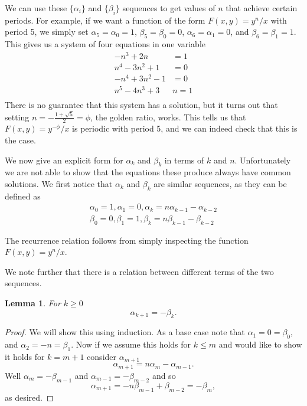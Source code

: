 \documentclass[12pt]{article}
\newtheorem{lemma}{Lemma}
\begin{document}
We can use these $\{\alpha_i\}$ and $\{\beta_i\}$ sequences to get values of $n$ that achieve certain periods. For example, if we want a function of the form $F(x,y) = y^n/x$ with period 5, we simply set $\alpha_5 = \alpha_0 = 1$, $\beta_5 = \beta_0 = 0$, $\alpha_6 = \alpha_1 = 0$, and $\beta_6 = \beta_1 = 1$. This gives us a system of four equations in one variable
\begin{align*}
-n^3+2n &= 1\\
n^4-3n^2+1&=0\\
-n^4+3n^2 -1&= 0\\
n^5-4n^3+3&n=1\\
\end{align*}
There is no guarantee that this system has a solution, but it turns out that setting $n = -\frac{1+\sqrt{5}}{2} = \phi$, the golden ratio, works. This tells us that $F(x,y) = y^{-\phi}/x$ is periodic with period 5, and we can indeed check that this is the case.

We now give an explicit form for $\alpha_k$ and $\beta_k$ in terms of $k$ and $n$. Unfortunately we are not able to show that the equations these produce always have common solutions. 
We first notice that $\alpha_k$ and $\beta_k$ are similar sequences, as they can be defined as
\begin{align*}
\alpha_0 = 1, \alpha_1 = 0, \alpha_k = n\alpha_{k-1} - \alpha_{k-2}\\
\beta_0 = 0, \beta_1 = 1, \beta_k = n\beta_{k-1} - \beta_{k-2}
\end{align*}

The recurrence relation follows from simply inspecting the function $F(x,y) = y^n/x$.

We note further that there is a relation between different terms of the two sequences.  
\begin{lemma} 
\label{ab} For $k\geq 0$
\begin{equation*}
\alpha_{k+1} = - \beta_{k}.
\end{equation*}
\end{lemma}
\begin{proof}
We will show this using induction. As a base case note that $\alpha_1 = 0 = \beta_0$, and $\alpha_2 = -n = \beta_1$. Now if we assume this holds for $k \leq m$ and would like to show it holds for $k = m+1$ consider $\alpha_{m+1}$
\begin{equation*}
\alpha_{m+1} = n \alpha_{m} - \alpha_{m-1}.
\end{equation*}
Well $\alpha_m = -\beta_{m-1}$ and $\alpha_{m-1} = - \beta_{m-2}$ and so 
\begin{equation*}
\alpha_{m+1} = - n \beta_{m-1} + \beta_{m-2} = -\beta_{m},
\end{equation*}
as desired.
\end{proof}
\end{document}
